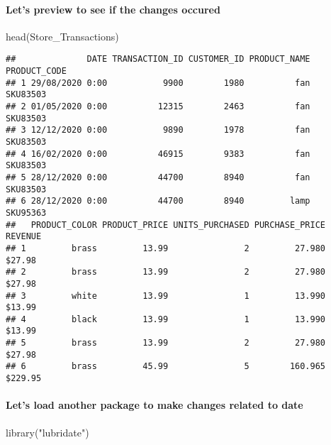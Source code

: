 \documentclass[
]{article}
\newenvironment{Shaded}{\begin{snugshade}}{\end{snugshade}}
\newcommand{\FunctionTok}[1]{\textcolor[rgb]{0.00,0.00,0.00}{#1}}
\newcommand{\NormalTok}[1]{#1}
\newcommand{\StringTok}[1]{\textcolor[rgb]{0.31,0.60,0.02}{#1}}
\begin{document}
\hypertarget{lets-preview-to-see-if-the-changes-occured}{%
\paragraph{Let's preview to see if the changes
occured}\label{lets-preview-to-see-if-the-changes-occured}}

\begin{Shaded}
\begin{Highlighting}[]
\FunctionTok{head}\NormalTok{(Store\_Transactions)}
\end{Highlighting}
\end{Shaded}

\begin{verbatim}
##              DATE TRANSACTION_ID CUSTOMER_ID PRODUCT_NAME PRODUCT_CODE
## 1 29/08/2020 0:00           9900        1980          fan     SKU83503
## 2 01/05/2020 0:00          12315        2463          fan     SKU83503
## 3 12/12/2020 0:00           9890        1978          fan     SKU83503
## 4 16/02/2020 0:00          46915        9383          fan     SKU83503
## 5 28/12/2020 0:00          44700        8940          fan     SKU83503
## 6 28/12/2020 0:00          44700        8940         lamp     SKU95363
##   PRODUCT_COLOR PRODUCT_PRICE UNITS_PURCHASED PURCHASE_PRICE  REVENUE
## 1         brass         13.99               2         27.980  $27.98 
## 2         brass         13.99               2         27.980  $27.98 
## 3         white         13.99               1         13.990  $13.99 
## 4         black         13.99               1         13.990  $13.99 
## 5         brass         13.99               2         27.980  $27.98 
## 6         brass         45.99               5        160.965 $229.95
\end{verbatim}

\hypertarget{lets-load-another-package-to-make-changes-related-to-date}{%
\paragraph{Let's load another package to make changes related to
date}\label{lets-load-another-package-to-make-changes-related-to-date}}

\begin{Shaded}
\begin{Highlighting}[]
\FunctionTok{library}\NormalTok{(}\StringTok{"lubridate"}\NormalTok{)}
\end{Highlighting}
\end{Shaded}
\end{document}

